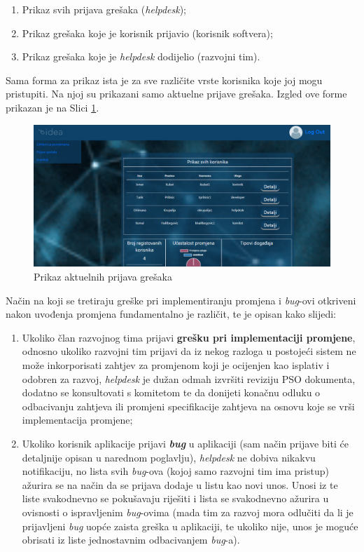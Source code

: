 \documentclass[12pt,a4paper]{article}
\begin{document}
\begin{enumerate}
\item Prikaz svih prijava grešaka (\textit{helpdesk});
\item Prikaz grešaka koje je korisnik prijavio (korisnik softvera);
\item Prikaz grešaka koje je \textit{helpdesk} dodijelio (razvojni tim).
\end{enumerate}

Sama forma za prikaz ista je za sve različite vrste korisnika koje joj mogu pristupiti. Na njoj su prikazani samo aktuelne prijave grešaka. Izgled ove forme prikazan je na Slici \ref{s11}.

\begin{figure}[H]
\center
\includegraphics[scale=0.35]{../res/UI/report1.PNG}
\caption{Prikaz aktuelnih prijava grešaka}
\label{s11}
\end{figure}

Način na koji se tretiraju greške pri implementiranju promjena i \textit{bug}-ovi otkriveni nakon uvođenja promjena fundamentalno je različit, te je opisan kako slijedi:
\begin{enumerate}
\item Ukoliko član razvojnog tima prijavi \textbf{grešku pri implementaciji promjene}, odnosno ukoliko razvojni tim prijavi da iz nekog razloga u postojeći sistem ne može inkorporisati zahtjev za promjenom koji je ocijenjen kao isplativ i odobren za razvoj, \textit{helpdesk} je dužan odmah izvršiti reviziju PSO dokumenta, dodatno se konsultovati s komitetom te da donijeti konačnu odluku o odbacivanju zahtjeva ili promjeni specifikacije zahtjeva na osnovu koje se vrši implementacija promjene;
\item Ukoliko korisnik aplikacije prijavi \textbf{\textit{bug}} u aplikaciji (sam način prijave biti će detaljnije opisan u narednom poglavlju), \textit{helpdesk} ne dobiva nikakvu notifikaciju, no lista svih \textit{bug}-ova (kojoj samo razvojni tim ima pristup) ažurira se na način da se prijava dodaje u listu kao novi unos. Unosi iz te liste svakodnevno se pokušavaju riješiti i lista se svakodnevno ažurira u ovisnosti o ispravljenim \textit{bug}-ovima (mada tim za razvoj mora odlučiti da li je prijavljeni \textit{bug} uopće zaista greška u aplikaciji, te ukoliko nije, unos je moguće obrisati iz liste jednostavnim odbacivanjem \textit{bug}-a).
\end{enumerate}
\end{document}
